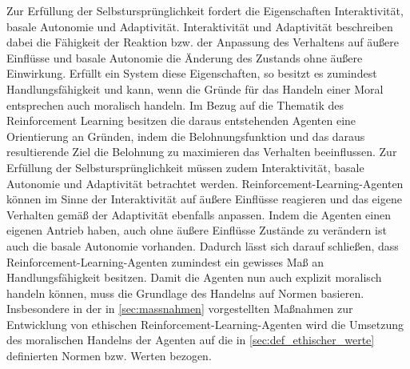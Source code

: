 Zur Erfüllung der Selbstursprünglichkeit fordert \cite{bendel2019} die Eigenschaften Interaktivität, basale Autonomie und Adaptivität.
Interaktivität und Adaptivität beschreiben dabei die Fähigkeit der Reaktion bzw. der Anpassung des Verhaltens auf äußere Einflüsse und basale Autonomie die Änderung des Zustands ohne äußere Einwirkung.
Erfüllt ein System diese Eigenschaften, so besitzt es zumindest Handlungsfähigkeit und kann, wenn die Gründe für das Handeln einer Moral entsprechen auch moralisch handeln.
\ab 
Im Bezug auf die Thematik des Reinforcement Learning besitzen die daraus entstehenden Agenten eine Orientierung an Gründen, indem die Belohnungsfunktion und das daraus resultierende Ziel die Belohnung zu maximieren das Verhalten beeinflussen.
Zur Erfüllung der Selbstursprünglichkeit müssen zudem Interaktivität, basale Autonomie und Adaptivität betrachtet werden.
Reinforcement-Learning-Agenten können im Sinne der Interaktivität auf äußere Einflüsse reagieren und das eigene Verhalten gemäß der Adaptivität ebenfalls anpassen.
Indem die Agenten einen eigenen Antrieb haben, auch ohne äußere Einflüsse Zustände zu verändern ist auch die basale Autonomie vorhanden.
Dadurch lässt sich darauf schließen, dass Reinforcement-Learning-Agenten zumindest ein gewisses Maß an Handlungsfähigkeit besitzen.
Damit die Agenten nun auch explizit moralisch handeln können, muss die Grundlage des Handelns auf Normen basieren.
Insbesondere in der in \autoref{sec:massnahmen} vorgestellten Maßnahmen zur Entwicklung von ethischen Reinforcement-Learning-Agenten wird die Umsetzung des moralischen Handelns der Agenten auf die in \autoref{sec:def_ethischer_werte} definierten Normen bzw. Werten bezogen.
